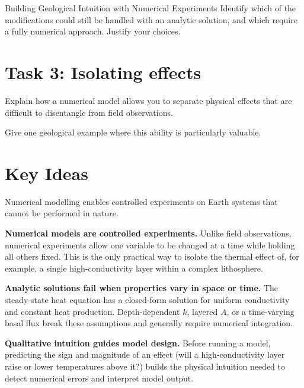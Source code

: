 \begin{activity}{Building Geological Intuition with Numerical Experiments}
Identify which of the modifications could still be handled with an analytic solution, and which require a fully numerical approach. Justify your choices.
\answerbox[5cm]

\section*{Task 3: Isolating effects}

Explain how a numerical model allows you to separate physical effects that are difficult to disentangle from field observations.

Give one geological example where this ability is particularly valuable.
\answerbox[5cm]

\section*{Key Ideas}

Numerical modelling enables controlled experiments on Earth systems that cannot be performed in nature.

\textbf{Numerical models are controlled experiments.} Unlike field observations, numerical experiments allow one variable to be changed at a time while holding all others fixed. This is the only practical way to isolate the thermal effect of, for example, a single high-conductivity layer within a complex lithosphere.

\textbf{Analytic solutions fail when properties vary in space or time.} The steady-state heat equation has a closed-form solution for uniform conductivity and constant heat production. Depth-dependent $k$, layered $A$, or a time-varying basal flux break these assumptions and generally require numerical integration.

\textbf{Qualitative intuition guides model design.} Before running a model, predicting the sign and magnitude of an effect (will a high-conductivity layer raise or lower temperatures above it?) builds the physical intuition needed to detect numerical errors and interpret model output.

\end{activity}
